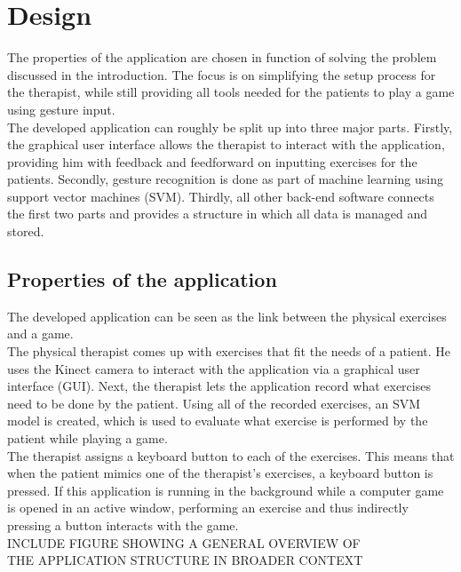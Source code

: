 \chapter{Design}

The properties of the application are chosen in function of solving the problem discussed in the introduction. The focus is on simplifying the setup process for the therapist, while still providing all tools needed for the patients to play a game using gesture input.\\

The developed application can roughly be split up into three major parts. Firstly, the graphical user interface allows the therapist to interact with the application, providing him with feedback and feedforward on inputting exercises for the patients. Secondly, gesture recognition is done as part of machine learning using support vector machines (SVM). Thirdly, all other back-end software connects the first two parts and provides a structure in which all data is managed and stored.


\section{Properties of the application}

The developed application can be seen as the link between the physical exercises and a game.\\

The physical therapist comes up with exercises that fit the needs of a patient. He uses the Kinect camera to interact with the application via a graphical user interface (GUI). Next, the therapist lets the application record what exercises need to be done by the patient. Using all of the recorded exercises, an SVM model is created, which is used to evaluate what exercise is performed by the patient while playing a game.\\

The therapist assigns a keyboard button to each of the exercises. This means that when the patient mimics one of the therapist's exercises, a keyboard button is pressed. If this application is running in the background while a computer game is opened in an active window, performing an exercise and thus indirectly pressing a button interacts with the game.\\

INCLUDE FIGURE SHOWING A GENERAL OVERVIEW OF\\
THE APPLICATION STRUCTURE IN BROADER CONTEXT\\

